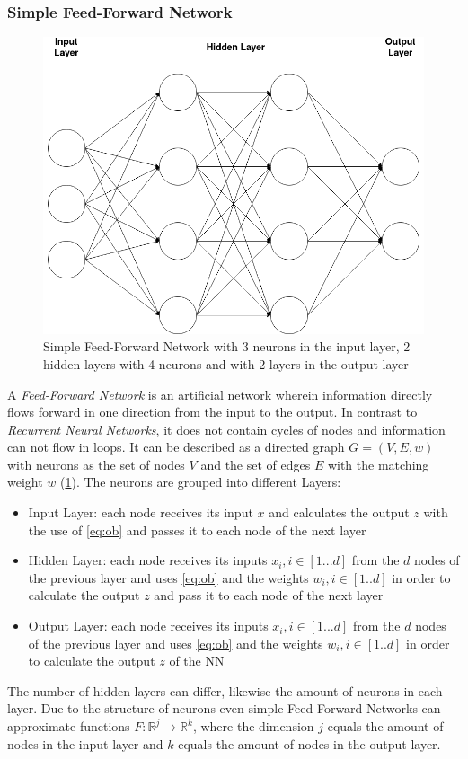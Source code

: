 \subsubsection{Simple Feed-Forward Network}
\begin{figure}
	\centering
	\includegraphics[width=0.55\linewidth]{figures/feedforward.png}
	\caption{Simple Feed-Forward Network with 3 neurons in the input layer, 2 hidden layers with 4 neurons and with 2 layers in the output layer}
	\label{fig:ffn}
\end{figure}
A \emph{Feed-Forward Network} is an artificial network wherein information directly flows forward in one direction from the input to the output. 
In contrast to \emph{Recurrent Neural Networks}, it does not contain cycles of nodes and information can not flow in loops. 
It can be described as a directed graph $G = (V,E,w)$ with neurons as the set of nodes $V$ and the set of edges $E$ with the matching weight $w$ (\cref{fig:ffn}). 
The neurons are grouped into different Layers:
\begin{itemize}
	\item Input Layer: each node receives its input $x$ and calculates the output $z$ with the use of \cref{eq:ob} and passes it to each node of the next layer
	\item Hidden Layer: each node receives its inputs $x_i, i \in [1...d]$ from the $d$ nodes of the previous layer and uses \cref{eq:ob} and the weights $w_i, i \in [1..d]$ in order to calculate the output $z$ and pass it to each node of the next layer
	\item Output Layer: each node receives its inputs $x_i, i \in [1...d]$ from the $d$ nodes of the previous layer and uses \cref{eq:ob} and the weights $w_i, i \in [1..d]$ in order to calculate the output $z$ of the NN
\end{itemize}
The number of hidden layers can differ, likewise the amount of neurons in each layer. 
Due to the structure of neurons even simple Feed-Forward Networks can approximate functions $F: \mathbb{R}^j \to \mathbb{R}^k$, 
where the dimension $j$ equals the amount of nodes in the input layer and $k$ equals the amount of nodes in the output layer.

